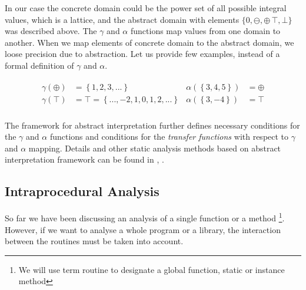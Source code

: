         In our case the concrete domain could be the power set of all 
        possible integral values, which is a lattice, and the abstract 
        domain with elements $\{0, \ominus, \oplus\, \top, \bot\}$ was 
        described above. The $\gamma$ and $\alpha$ functions map values 
        from one domain to another. When we map elements of concrete domain 
        to the abstract domain, we loose precision due to abstraction. 
        Let us provide few examples, instead of a formal definition 
        of $\gamma$ and $\alpha$.
        
        \begin{align*}
            \begin{split}
                \gamma{}(\oplus) &= \left\{1, 2, 3, ...\right\} \\
                \gamma{}(\top) &= \top = \left\{..., -2, 1, 0, 1, 2, ...\right\} \\
            \end{split}
            \begin{split}
                \alpha{}(\left\{3, 4, 5\right\}) &= \oplus \\ 
                \alpha{}(\left\{3, -4\right\}) &= \top \\
            \end{split}
        \end{align*}
        
        The framework for abstract interpretation further defines 
        necessary conditions for the $\gamma$ and $\alpha$ functions 
        and conditions for the \emph{transfer functions} with respect 
        to $\gamma$ and $\alpha$ mapping. Details and other 
        static analysis methods based on abstract interpretation 
        framework can be found in \cite{cousot1977abstract}, 
        \cite{Cousot2000abstract}.

        \subsection{Intraprocedural Analysis}
        
        So far we have been discussing an analysis of a single function 
        or a method \footnote{We will use term 
        routine to designate a global function, static or instance method}. 
        However, if we want to analyse a whole program or 
        a library, the interaction between the routines 
        must be taken into account.
        
